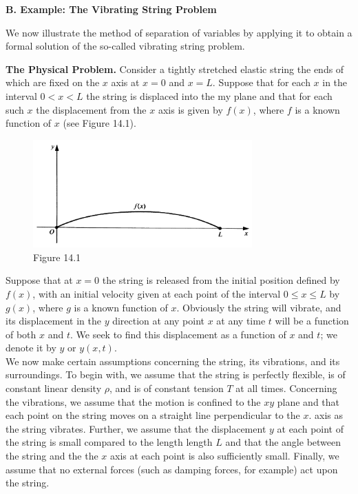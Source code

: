 \documentclass[11pt,a4paper, twoside]{report}
\begin{document}
	\textbf{B. Example: The Vibrating String Problem}\par
	We now illustrate the method of separation of variables by applying it to obtain a formal solution of the so-called vibrating string problem.\par
	\textbf{The Physical Problem.} Consider a tightly stretched elastic string the ends of which are fixed on the $x$ axis at $x = 0$ and $x = L$. Suppose that for each $x$ in the interval $0 < x < L$ the string is displaced into the my plane and that for each such $x$ the displacement from the $x$ axis is given by $f(x)$, where $f$ is a known function of $x$ (see Figure 14.1).
	\begin{figure}[H]
		\centering
		\includegraphics[width=0.75\textwidth]{figure/1_page_1.PNG}
		\caption*{Figure 14.1}
	\end{figure}
	Suppose that at $x = 0$ the string is released from the initial position defined by $f(x)$, with an initial velocity given at each point of the interval $0 \leq x \leq L$ by $g(x)$, where $g$ is a known function of $x$. Obviously the string will vibrate, and its displacement in the $y$ direction at any point $x$ at any time $t$ will be a function of both $x$ and $t$. We seek to find this displacement as a function of $x$ and $t$; we denote it by $y$ or $y(x, t)$.\\
	We now make certain assumptions concerning the string, its vibrations, and its  surroundings. To begin with, we assume that the string is perfectly flexible, is of  constant linear density $\rho$, and is of constant tension $T$ at all times. Concerning the vibrations, we assume that the motion is confined to the $xy$ plane and that each point on the string moves on a straight line perpendicular to the $x$. axis as the string vibrates. Further, we assume that the displacement $y$ at each point of the string is small compared to the length length $L$ and that the angle between the string and the the $x$ axis at each point is also sufficiently small. Finally, we assume that no external forces (such as damping forces, for example) act upon the string.\\
\end{document}
